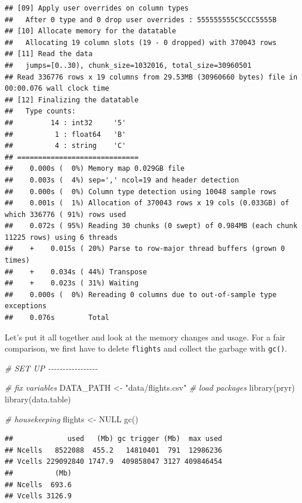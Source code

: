 \documentclass[
  12pt,
]{style/krantz}
\newenvironment{Shaded}{\begin{snugshade}}{\end{snugshade}}
\newcommand{\CommentTok}[1]{\textcolor[rgb]{0.56,0.35,0.01}{\textit{#1}}}
\newcommand{\ConstantTok}[1]{\textcolor[rgb]{0.00,0.00,0.00}{#1}}
\newcommand{\FunctionTok}[1]{\textcolor[rgb]{0.00,0.00,0.00}{#1}}
\newcommand{\NormalTok}[1]{#1}
\newcommand{\OtherTok}[1]{\textcolor[rgb]{0.56,0.35,0.01}{#1}}
\newcommand{\StringTok}[1]{\textcolor[rgb]{0.31,0.60,0.02}{#1}}
\begin{document}
\begin{verbatim}
## [09] Apply user overrides on column types
##   After 0 type and 0 drop user overrides : 555555555C5CCC5555B
## [10] Allocate memory for the datatable
##   Allocating 19 column slots (19 - 0 dropped) with 370043 rows
## [11] Read the data
##   jumps=[0..30), chunk_size=1032016, total_size=30960501
## Read 336776 rows x 19 columns from 29.53MB (30960660 bytes) file in 00:00.076 wall clock time
## [12] Finalizing the datatable
##   Type counts:
##         14 : int32     '5'
##          1 : float64   'B'
##          4 : string    'C'
## =============================
##    0.000s (  0%) Memory map 0.029GB file
##    0.003s (  4%) sep=',' ncol=19 and header detection
##    0.000s (  0%) Column type detection using 10048 sample rows
##    0.001s (  1%) Allocation of 370043 rows x 19 cols (0.033GB) of which 336776 ( 91%) rows used
##    0.072s ( 95%) Reading 30 chunks (0 swept) of 0.984MB (each chunk 11225 rows) using 6 threads
##    +    0.015s ( 20%) Parse to row-major thread buffers (grown 0 times)
##    +    0.034s ( 44%) Transpose
##    +    0.023s ( 31%) Waiting
##    0.000s (  0%) Rereading 0 columns due to out-of-sample type exceptions
##    0.076s        Total
\end{verbatim}

Let's put it all together and look at the memory changes and usage. For a fair comparison, we first have to delete \texttt{flights} and collect the garbage with \texttt{gc()}.

\begin{Shaded}
\begin{Highlighting}[]
\CommentTok{\# SET UP {-}{-}{-}{-}{-}{-}{-}{-}{-}{-}{-}{-}{-}{-}{-}{-}{-}}

\CommentTok{\# fix variables}
\NormalTok{DATA\_PATH }\OtherTok{\textless{}{-}} \StringTok{"data/flights.csv"}
\CommentTok{\# load packages}
\FunctionTok{library}\NormalTok{(pryr) }
\FunctionTok{library}\NormalTok{(data.table)}

\CommentTok{\# housekeeping}
\NormalTok{flights }\OtherTok{\textless{}{-}} \ConstantTok{NULL}
\FunctionTok{gc}\NormalTok{()}
\end{Highlighting}
\end{Shaded}

\begin{verbatim}
##             used   (Mb) gc trigger (Mb)  max used
## Ncells   8522088  455.2   14810401  791  12986236
## Vcells 229092840 1747.9  409858047 3127 409846454
##          (Mb)
## Ncells  693.6
## Vcells 3126.9
\end{verbatim}
\end{document}
